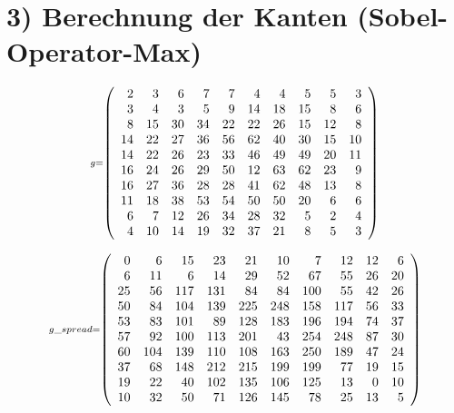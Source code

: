 \documentclass[11pt]{article}
\begin{document}
\newpage
    
    \hypertarget{berechnung-der-kanten-sobel-operator-max}{%
\section*{3) Berechnung der Kanten
(Sobel-Operator-Max)}\label{berechnung-der-kanten-sobel-operator-max}}


    \[\scriptstyle g =  \def\g{\color{lightgray}}\left(\begin{array}{rrrrrrrrrr}2 & 3 & 6 & 7 & 7 & 4 & 4 & 5 & 5 & 3\\3 & 4 & 3 & 5 & 9 & 14 & 18 & 15 & 8 & 6\\8 & 15 & 30 & 34 & 22 & 22 & 26 & 15 & 12 & 8\\14 & 22 & 27 & 36 & 56 & 62 & 40 & 30 & 15 & 10\\14 & 22 & 26 & 23 & 33 & 46 & 49 & 49 & 20 & 11\\16 & 24 & 26 & 29 & 50 & 12 & 63 & 62 & 23 & 9\\16 & 27 & 36 & 28 & 28 & 41 & 62 & 48 & 13 & 8\\11 & 18 & 38 & 53 & 54 & 50 & 50 & 20 & 6 & 6\\6 & 7 & 12 & 26 & 34 & 28 & 32 & 5 & 2 & 4\\4 & 10 & 14 & 19 & 32 & 37 & 21 & 8 & 5 & 3\end{array}\right)\]

    
    \[\scriptstyle g\_spread =  \def\g{\color{lightgray}}\left(\begin{array}{rrrrrrrrrr}0 & 6 & 15 & 23 & 21 & 10 & 7 & 12 & 12 & 6\\6 & 11 & 6 & 14 & 29 & 52 & 67 & 55 & 26 & 20\\25 & 56 & 117 & 131 & 84 & 84 & 100 & 55 & 42 & 26\\50 & 84 & 104 & 139 & 225 & 248 & 158 & 117 & 56 & 33\\53 & 83 & 101 & 89 & 128 & 183 & 196 & 194 & 74 & 37\\57 & 92 & 100 & 113 & 201 & 43 & 254 & 248 & 87 & 30\\60 & 104 & 139 & 110 & 108 & 163 & 250 & 189 & 47 & 24\\37 & 68 & 148 & 212 & 215 & 199 & 199 & 77 & 19 & 15\\19 & 22 & 40 & 102 & 135 & 106 & 125 & 13 & 0 & 10\\10 & 32 & 50 & 71 & 126 & 145 & 78 & 25 & 13 & 5\end{array}\right)\]

    \begin{center}
    \end{center}
    { \hspace*{\fill} \\}
    
\end{document}
